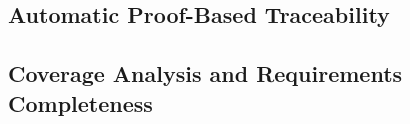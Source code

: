\subsection{Automatic Proof-Based Traceability}



\subsection{Coverage Analysis and Requirements Completeness}






